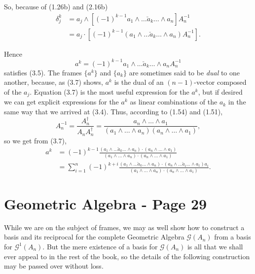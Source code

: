 \documentclass[fleqn]{scrartcl}
\numberwithin{equation}{section}
\begin{document}
\noindent So, because of (1.26b) and (2.16b)
\begin{align*}
\delta_j^k &= a_j \wedge [(-1)^{k-1} a_1 \wedge \dots \breve{a}_k \dots \wedge a_n] A_n^{-1} \\
&= a_j \cdot [(-1)^{k-1} (a_1 \wedge \dots \breve{a}_k \dots \wedge a_n) A_n^{-1}].
\end{align*}

\noindent Hence
\begin{equation}
a^k = (-1)^{k-1} a_1 \wedge \dots \breve{a}_k \dots \wedge a_n A_n^{-1} \tag{3.7}
\end{equation}
satisfies (3.5). The frames \(\{a^k\}\) and \(\{a_k\}\) are sometimes said to be \textit{dual} to one another, because, as (3.7) shows, \(a^k\) is the dual of an \((n-1)\)-vector composed of the \(a_j\). Equation (3.7) is the most useful expression for the \(a^k\), but if desired we can get explicit expressions for the \(a^k\) as linear combinations of the \(a_k\) in the same way that we arrived at (3.4). Thus, according to (1.54) and (1.51),
\[
A_n^{-1} = \frac{A_n^{\dagger}}{A_n A_n^{\dagger}} = \frac{a_n \wedge \dots \wedge a_1}{(a_1 \wedge \dots \wedge a_n)(a_n \wedge \dots \wedge a_1)},
\]
so we get from (3.7),
\begin{equation}
\begin{aligned}
a^k &= (-1)^{k-1} \frac{(a_1 \wedge \dots \breve{a}_k \dots \wedge a_n) \cdot (a_n \wedge \dots \wedge a_1)}{(a_1 \wedge \dots \wedge a_n) \cdot (a_n \wedge \dots \wedge a_1)} \\
&= \sum_{i=1}^n (-1)^{k+i} \frac{(a_1 \wedge \dots \breve{a}_k \dots \wedge a_n) \cdot (a_n \wedge \dots \breve{a}_i \dots \wedge a_1) a_i}{(a_1 \wedge \dots \wedge a_n) \cdot (a_n \wedge \dots \wedge a_1)}.
\end{aligned}
\tag{3.8}
\end{equation}

\section*{Geometric Algebra - Page 29}

\noindent While we are on the subject of frames, we may as well show how to construct a basis and its reciprocal for the complete Geometric Algebra \(\mathscr{G}(A_n)\) from a basis for \(\mathscr{G}^1(A_n)\). But the mere existence of a basis for \(\mathscr{G}(A_n)\) is all that we shall ever appeal to in the rest of the book, so the details of the following construction may be passed over without loss.
\end{document}
